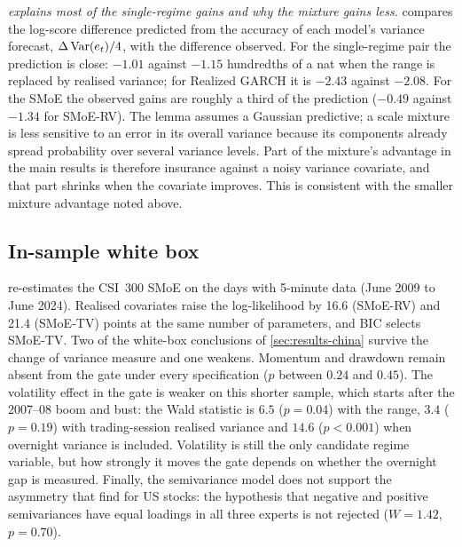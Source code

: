\emph{ explains most of the single-regime gains and why the mixture gains less.}
 compares the log-score difference predicted from the accuracy of each model's
variance forecast, $\Delta\operatorname{Var}(e_t)/4$, with the difference observed. For the single-regime pair the
prediction is close: $-1.01$ against $-1.15$ hundredths of a nat when the range is replaced by
realised variance; for Realized GARCH it is $-2.43$ against $-2.08$. For the SMoE the observed gains
are roughly a third of the prediction ($-0.49$ against $-1.34$ for SMoE-RV). The lemma assumes a
Gaussian predictive; a scale mixture is less sensitive to an error in its overall variance because
its components already spread probability over several variance levels. Part of the mixture's
advantage in the main results is therefore insurance against a noisy variance covariate, and that
part shrinks when the covariate improves. This is consistent with the smaller mixture advantage
noted above.




\subsection{In-sample white box}

 re-estimates the CSI~300 SMoE on the days with 5-minute data (June 2009 to
June 2024). Realised covariates raise the log-likelihood by 16.6 (SMoE-RV) and 21.4 (SMoE-TV) points
at the same number of parameters, and BIC selects SMoE-TV. Two of the white-box conclusions of
\cref{sec:results-china} survive the change of variance measure and one weakens. Momentum and drawdown
remain absent from the gate under every specification ($p$ between $0.24$ and $0.45$). The
volatility effect in the gate is weaker on this shorter sample, which starts after the 2007--08
boom and bust: the Wald statistic is $6.5$ ($p=0.04$) with the range, $3.4$ ($p=0.19$) with
trading-session realised variance and $14.6$ ($p<0.001$) when overnight variance is included.
Volatility is still the only candidate regime variable, but how strongly it moves the gate depends on
whether the overnight gap is measured. Finally, the semivariance model does not support the
asymmetry that \citet{patton2015good} find for US stocks: the hypothesis that negative and positive
semivariances have equal loadings in all three experts is not rejected ($W=1.42$, $p=0.70$).



